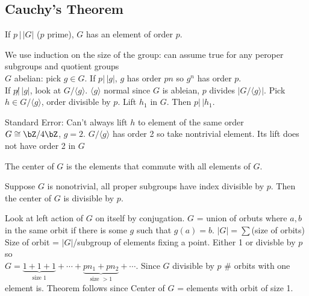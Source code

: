 \subsection{Cauchy's Theorem}

\begin{theorem}
    If $p \, | \, |G|$ ($p$ prime), $G$ has an element of order $p$. 
\end{theorem}

\begin{pf}
    We use induction on the size of the group: can assume true for any peroper subgroups and quotient groups \\
    $G$ abelian: pick $g \in G$. If $p | \, |g|$, $g$ has order $pn$ so $g^n$ has order $p$. \\
    If $p \not| \, |g|$, look at $G/\langle g \rangle$. $\langle g \rangle$ normal since $G$ is ableian, $p$ divides $|G/\langle g \rangle|$. Pick $h \in G/\langle g \rangle$, order divisible by $p$. Lift $h_1$ in $G$. Then $p | \, |h_1$. 
\end{pf} 


\noindent
Standard Error: Can't always lift $h$ to element of the same order \\
$G \cong \bZ/4\bZ$, $g = 2$. $G/\langle g \rangle$ has order 2 so take nontrivial element. Its lift does not have order 2 in $G$

\begin{definition}
    The center of $G$ is the elements that commute with all elements of $G$.
\end{definition}

\begin{lemma}
    Suppose $G$ is nonotrivial, all proper subgroups have index divisible by $p$. Then the center of $G$ is divisible by $p$.
\end{lemma} 

\begin{pf}
    Look at left action of $G$ on itself by conjugation. 
    $G$ = union of orbuts where $a,b$ in the same orbit if there is some $g$ such that $g(a)=b$. $|G| = \sum$(size of orbits) \\
    Size of orbit = $|G|$/subgroup of elements fixing a point. Either 1 or divisble by $p$ so \\
    $G = \underbrace{1 + 1  +1}_{\text{size }1} + \cdots + \underbrace{pn_1 + pn_2}_{\text{size }>1} + \cdots$. Since $G$ divisible by $p$ \# orbits with one element is. Theorem follows since Center of $G$ = elements with orbit of size 1.  
\end{pf}

